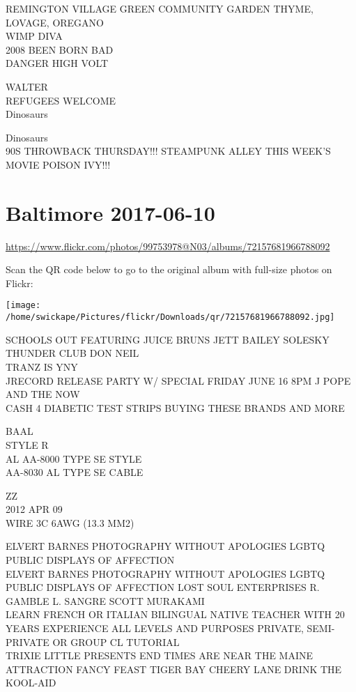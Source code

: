 \documentclass[10pt,letterpaper]{article}
\begin{document}
REMINGTON VILLAGE GREEN COMMUNITY GARDEN THYME, LOVAGE, OREGANO\\
WIMP DIVA\\
2008 BEEN BORN BAD\\
DANGER HIGH VOLT

WALTER\\
REFUGEES WELCOME\\
Dinosaurs

Dinosaurs\\
90S THROWBACK THURSDAY!!! STEAMPUNK ALLEY THIS WEEK'S MOVIE POISON IVY!!!
\pagebreak

\section*{Baltimore 2017-06-10}

\url{https://www.flickr.com/photos/99753978@N03/albums/72157681966788092}

Scan the QR code below to go to the original album with full-size photos on Flickr:

\texttt{[image: /home/swickape/Pictures/flickr/Downloads/qr/72157681966788092.jpg]}
\pagebreak

SCHOOLS OUT FEATURING JUICE BRUNS JETT BAILEY SOLESKY THUNDER CLUB DON NEIL\\
TRANZ IS YNY\\
JRECORD RELEASE PARTY W/ SPECIAL FRIDAY JUNE 16 8PM J POPE AND THE NOW\\
CASH 4 DIABETIC TEST STRIPS BUYING THESE BRANDS AND MORE

BAAL\\
STYLE R\\
AL AA{-}8000 TYPE SE STYLE\\
AA{-}8030 AL TYPE SE CABLE

ZZ\\
2012 APR 09\\
WIRE 3C 6AWG (13.3 MM2)

ELVERT BARNES PHOTOGRAPHY WITHOUT APOLOGIES LGBTQ PUBLIC DISPLAYS OF AFFECTION\\
ELVERT BARNES PHOTOGRAPHY WITHOUT APOLOGIES LGBTQ PUBLIC DISPLAYS OF AFFECTION LOST SOUL ENTERPRISES R. GAMBLE L. SANGRE SCOTT MURAKAMI\\
LEARN FRENCH OR ITALIAN BILINGUAL NATIVE TEACHER WITH 20 YEARS EXPERIENCE ALL LEVELS AND PURPOSES PRIVATE, SEMI{-}PRIVATE OR GROUP CL TUTORIAL\\
TRIXIE LITTLE PRESENTS END TIMES ARE NEAR THE MAINE ATTRACTION FANCY FEAST TIGER BAY CHEERY LANE DRINK THE KOOL{-}AID
\end{document}
